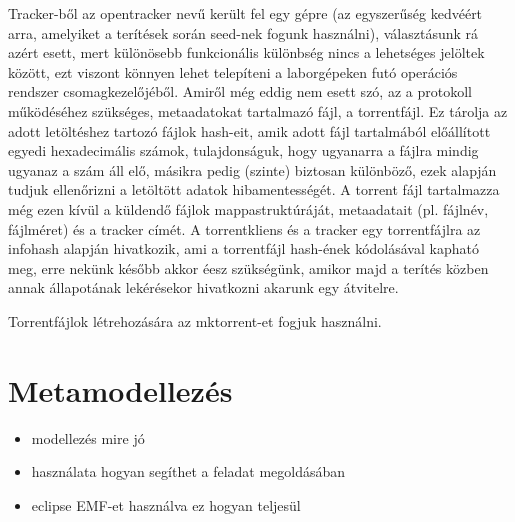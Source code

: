 Tracker-ből az opentracker nevű került fel egy gépre (az egyszerűség kedvéért arra, amelyiket a terítések során seed-nek fogunk használni), választásunk rá azért esett, mert különösebb funkcionális különbség nincs a lehetséges jelöltek között, ezt viszont könnyen lehet telepíteni a laborgépeken futó operációs rendszer csomagkezelőjéből. Amiről még eddig nem esett szó, az a protokoll működéséhez szükséges, metaadatokat tartalmazó fájl, a torrentfájl. Ez tárolja az adott letöltéshez tartozó fájlok hash-eit, amik adott fájl tartalmából előállított egyedi hexadecimális számok, tulajdonságuk, hogy ugyanarra a fájlra mindig ugyanaz a szám áll elő, másikra pedig (szinte) biztosan különböző, ezek alapján tudjuk ellenőrizni a letöltött adatok hibamentességét. A torrent fájl tartalmazza még ezen kívül a küldendő fájlok mappastruktúráját, metaadatait (pl. fájlnév, fájlméret) és a tracker címét. A torrentkliens és a tracker egy torrentfájlra az infohash alapján hivatkozik, ami a torrentfájl hash-ének kódolásával kapható meg, erre nekünk később akkor éesz szükségünk, amikor majd a terítés közben annak állapotának lekérésekor hivatkozni akarunk egy átvitelre.

Torrentfájlok létrehozására az mktorrent-et\cite{mktorrent} fogjuk használni.


\section{Metamodellezés}
\begin{itemize}
  \item modellezés mire jó
  \item	használata hogyan segíthet a feladat megoldásában
  \item eclipse EMF-et használva ez hogyan teljesül
\end{itemize}